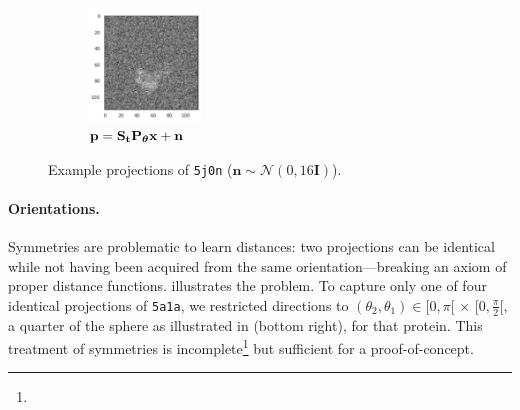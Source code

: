 \begin{figure}[ht!]
\begin{minipage}[b]{0.48\linewidth}
\begin{subfigure}[b]{0.49\linewidth}
        \end{subfigure}
        \hfill
        \begin{subfigure}[b]{0.49\linewidth}
            \centering
            \includegraphics[height=3cm]{figures/5j0n_noise16_translated}
            \caption{$\mathbf{p} = \mathbf{S}_{\mathbf{t}} \mathbf{P}_{{\boldsymbol{\theta}}} \mathbf{x} + \mathbf{n}$}
        \end{subfigure}
        \caption{%
            Example projections of \texttt{5j0n} ($\mathbf{n} \sim \mathcal{N}(0, 16\mathbf{I})$).
        }\label{fig:different-projections}
    \end{minipage}
\end{figure}

\paragraph{Orientations.}
Symmetries are problematic to learn distances: two projections can be identical while not having been acquired from the same orientation---breaking an axiom of proper distance functions.
 illustrates the problem.
To capture only one of four identical projections of \texttt{5a1a}, we restricted directions to $(\theta_2, \theta_1) \in [0, \pi[ \, \times \, [0, \frac{\pi}{2}[$, a quarter of the sphere as illustrated in  (bottom right), for that protein.
This treatment of symmetries is incomplete\footnote{} but sufficient for a proof-of-concept.

